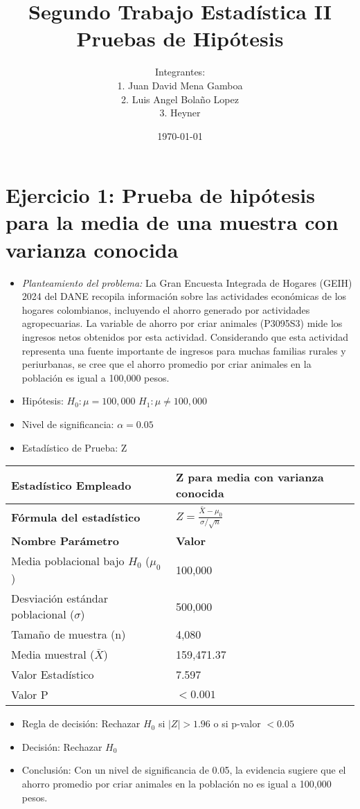\documentclass[12pt,a4paper]{article}
\title{\textbf{Segundo Trabajo Estadística II} \\[0.5cm]
Pruebas de Hipótesis}
\author{
Integrantes: \\ 
1. Juan David Mena Gamboa \\ 
2. Luis Angel Bolaño Lopez \\ 
3. Heyner}
\date{\today}
\begin{document}
\maketitle

\section*{Ejercicio 1: Prueba de hipótesis para la media de una muestra con varianza conocida}
\begin{itemize}
    \item \textit{Planteamiento del problema:} La Gran Encuesta Integrada de Hogares (GEIH) 2024 del DANE recopila información sobre las actividades económicas de los hogares colombianos, incluyendo el ahorro generado por actividades agropecuarias. La variable de ahorro por criar animales (P3095S3) mide los ingresos netos obtenidos por esta actividad. Considerando que esta actividad representa una fuente importante de ingresos para muchas familias rurales y periurbanas, se cree que el ahorro promedio por criar animales en la población es igual a 100,000 pesos.
    \item Hipótesis: \quad $H_0: \mu = 100,000$ \hspace{2cm} $H_1: \mu \neq 100,000$
    \item Nivel de significancia: $\alpha = 0.05$
    \item Estadístico de Prueba: Z
\end{itemize}

\begin{tabular}{|m{7cm}|m{7cm}|}
\hline
\textbf{Estadístico Empleado} & Z para media con varianza conocida \\ \hline
\textbf{Fórmula del estadístico} & $Z = \frac{\bar{X} - \mu_0}{\sigma/\sqrt{n}}$ \\ \hline
\textbf{Nombre Parámetro} & \textbf{Valor} \\ \hline
Media poblacional bajo $H_0$ ($\mu_0$) & 100,000 \\ \hline
Desviación estándar poblacional ($\sigma$) & 500,000 \\ \hline
Tamaño de muestra (n) & 4,080 \\ \hline
Media muestral ($\bar{X}$) & 159,471.37 \\ \hline
Valor Estadístico & 7.597 \\ \hline
Valor P & $< 0.001$ \\ \hline
\end{tabular}

\begin{itemize}
    \item Regla de decisión: Rechazar $H_0$ si $|Z| > 1.96$ o si p-valor $< 0.05$
    \item Decisión: Rechazar $H_0$
    \item Conclusión: Con un nivel de significancia de 0.05, la evidencia sugiere que el ahorro promedio por criar animales en la población no es igual a 100,000 pesos.
\end{itemize}
\end{document}
